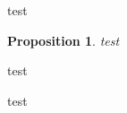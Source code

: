 \documentclass{beamer}
\newtheorem{proposition}{Proposition}
\begin{document}
\begin{frame}

\begin{theorem}
test
\end{theorem}

\begin{proposition}
test
\end{proposition}

\begin{definition}
test
\end{definition}

\begin{lemma}
test
\end{lemma}    

\end{frame}
\end{document}
